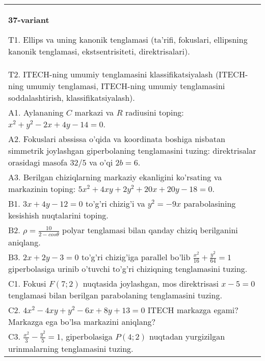 \documentclass{article}
\begin{document}
\begin{tabular}{m{17cm}}
\textbf{37-variant}
\newline

T1. Ellips va uning kanonik tenglamasi (ta'rifi, fokuslari, ellipsning kanonik tenglamasi, ekstsentrisiteti, direktrisalari).\\

T2. ITECH-ning umumiy tenglamasini klassifikatsiyalash (ITECH-ning umumiy tenglamasi, ITECH-ning umumiy tenglamasini soddalashtirish, klassifikatsiyalash).\\

A1. Aylananing $C$ markazi va $R$ radiusini toping: $x^2+y^2-2x+4y-14=0$.\\

A2. Fokuslari abssissa o'qida va koordinata boshiga nisbatan simmetrik joylashgan giperbolaning tenglamasini tuzing: direktrisalar orasidagi masofa $32/5$ va o'qi $2b=6$.\\

A3. Berilgan chiziqlarning markaziy ekanligini ko'rsating va markazinin toping: $5x^{2}+4xy+2y^{2}+20x+20y-18=0$.\\

B1. $3x + 4y - 12 = 0$ to'g'ri chizig'i va $y^{2} = - 9x$ parabolasining kesishish nuqtalarini toping.\\

B2. $\rho = \frac{10}{2 - cos\theta}$ polyar tenglamasi bilan qanday chiziq berilganini aniqlang.  \\

B3. $2x + 2y - 3 = 0$ to'g'ri chizig'iga parallel bo'lib $\frac{x^{2}}{16} + \frac{y^{2}}{64} = 1$ giperbolasiga urinib o'tuvchi to'g'ri chiziqning tenglamasini tuzing.  \\

C1. Fokusi $F(7;2)$ nuqtasida joylashgan, mos direktrisasi $x - 5 = 0$ tenglamasi bilan berilgan parabolaning tenglamasini tuzing.  \\

C2. $4x^{2} - 4xy + y^{2} - 6x + 8y + 13 = 0$ ITECH markazga egami? Markazga ega bo'lsa markazini aniqlang?  \\

C3. $\frac{x^{2}}{3} - \frac{y^{2}}{5} = 1$, giperbolasiga $P(4;2)$ nuqtadan yurgizilgan urinmalarning tenglamasini tuzing.  \\

\end{tabular}
\vspace{1cm}
\end{document}
